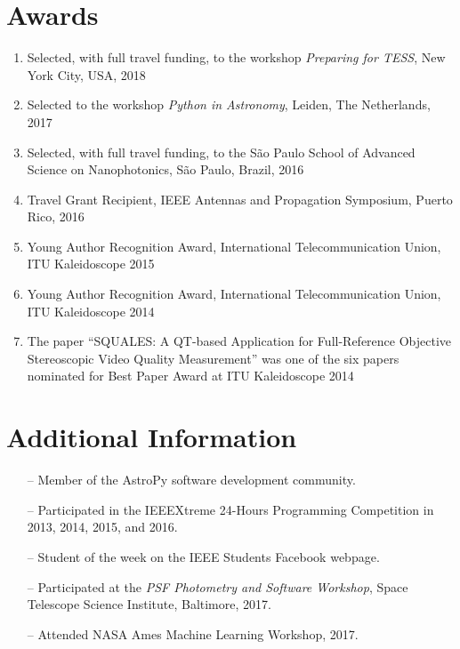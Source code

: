 \documentclass[10pt]{article}
\begin{document}
\begin{titlepage}
\section*{Awards}
\begin{enumerate}
  \item Selected, with full travel funding, to the workshop \textit{Preparing for TESS}, New York City, USA, 2018
  \item Selected to the workshop \textit{Python in Astronomy}, Leiden, The Netherlands, 2017
  \item Selected, with full travel funding, to the S\~ao Paulo School of Advanced Science on Nanophotonics, S\~ao Paulo, Brazil, 2016
  \item Travel Grant Recipient, IEEE Antennas and Propagation Symposium, Puerto Rico, 2016
  \item Young Author Recognition Award, International Telecommunication Union, ITU Kaleidoscope 2015
  \item Young Author Recognition Award, International Telecommunication Union, ITU Kaleidoscope 2014
  \item The paper ``SQUALES: A QT-based Application for Full-Reference Objective Stereoscopic
      Video Quality Measurement'' was one of the six papers nominated for Best Paper Award at ITU Kaleidoscope 2014
\end{enumerate}

\section*{Additional Information}
\begin{itemize}
    \item[--] Member of the AstroPy software development community.
    \item[--] Participated in the IEEEXtreme 24-Hours Programming Competition in 2013, 2014, 2015, and 2016.
    \item[--] Student of the week on the IEEE Students Facebook webpage.
    \item[--] Participated at the \textit{PSF Photometry and Software Workshop}, Space Telescope Science Institute, Baltimore, 2017.
    \item[--] Attended NASA Ames Machine Learning Workshop, 2017.
\end{itemize}

\end{titlepage}
\end{document}
